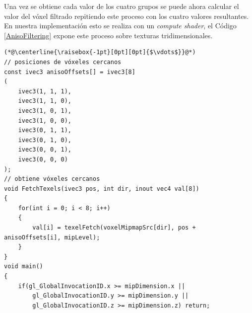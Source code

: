Una vez se obtiene cada valor de los cuatro grupos se puede ahora calcular el valor del vóxel filtrado repitiendo este proceso con los cuatro valores resultantes. En nuestra implementación esto se realiza con un \emph{compute shader}, el Código \ref{AnisoFiltering} expone este proceso sobre texturas tridimensionales.
\\
\begin{lstlisting}[caption={Filtrado sobre los volúmenes direccionales para obtener vóxeles anisótropos}, label=AnisoFiltering]
(*@\centerline{\raisebox{-1pt}[0pt][0pt]{$\vdots$}}@*)
// posiciones de vóxeles cercanos
const ivec3 anisoOffsets[] = ivec3[8]
(
	ivec3(1, 1, 1),
	ivec3(1, 1, 0),
	ivec3(1, 0, 1),
	ivec3(1, 0, 0),
	ivec3(0, 1, 1),
	ivec3(0, 1, 0),
	ivec3(0, 0, 1),
	ivec3(0, 0, 0)
);
// obtiene vóxeles cercanos
void FetchTexels(ivec3 pos, int dir, inout vec4 val[8]) 
{
	for(int i = 0; i < 8; i++)
	{
		val[i] = texelFetch(voxelMipmapSrc[dir], pos + anisoOffsets[i], mipLevel);
	}
}
void main()
{
	if(gl_GlobalInvocationID.x >= mipDimension.x ||
		gl_GlobalInvocationID.y >= mipDimension.y ||
		gl_GlobalInvocationID.z >= mipDimension.z) return;


\end{lstlisting}
